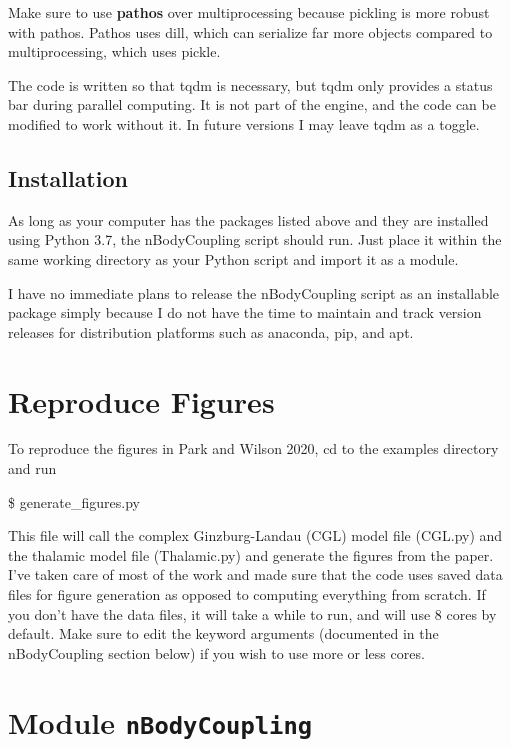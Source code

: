 \documentclass[english,a4paper,oneside]{article}
\begin{document}
Make sure to use \textbf{pathos} over multiprocessing because pickling
is more robust with pathos. Pathos uses dill, which can serialize far
more objects compared to multiprocessing, which uses pickle.

The code is written so that tqdm is necessary, but tqdm only provides a
status bar during parallel computing. It is not part of the engine, and
the code can be modified to work without it. In future versions I may
leave tqdm as a toggle.

\hypertarget{installation}{%
\subsection{Installation}\label{installation}}

As long as your computer has the packages listed above and they are
installed using Python 3.7, the nBodyCoupling script should run. Just
place it within the same working directory as your Python script and
import it as a module.

I have no immediate plans to release the nBodyCoupling script as an
installable package simply because I do not have the time to maintain
and track version releases for distribution platforms such as anaconda,
pip, and apt.

\hypertarget{reproduce-figures}{%
\section{Reproduce Figures}\label{reproduce-figures}}

To reproduce the figures in Park and Wilson 2020, cd to the examples
directory and run

\$ generate\_figures.py

This file will call the complex Ginzburg-Landau (CGL) model file
(CGL.py) and the thalamic model file (Thalamic.py) and generate the
figures from the paper. I've taken care of most of the work and made
sure that the code uses saved data files for figure generation as
opposed to computing everything from scratch. If you don't have the data
files, it will take a while to run, and will use 8 cores by default.
Make sure to edit the keyword arguments (documented in the nBodyCoupling
section below) if you wish to use more or less cores.

\hypertarget{nBodyCoupling}{%
\section{\texorpdfstring{Module
\texttt{nBodyCoupling}}{Module nBodyCoupling}}\label{nBodyCoupling}}
\end{document}
